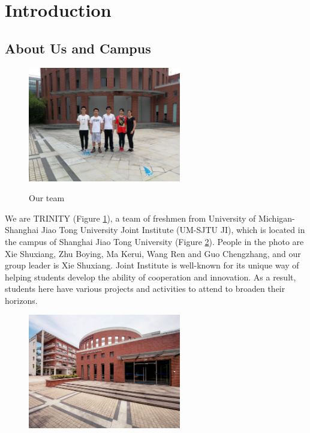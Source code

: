 \section{Introduction}

\subsection{About Us and Campus}

\begin{figure}[htbp]
\centering
\includegraphics[height=5cm]{figure/teamMember}
  \label{fig:teamMember}
  \caption{Our team}
\end{figure}

We are TRINITY (Figure \ref{fig:teamMember}), a team of freshmen from University of
Michigan-Shanghai Jiao Tong University Joint Institute (UM-SJTU JI), which is
located in the campus of Shanghai Jiao Tong University (Figure
\ref{fig:campus}). People in the photo are Xie Shuxiang, Zhu Boying, Ma Kerui,
Wang Ren and Guo Chengzhang, and our group leader is Xie Shuxiang. Joint
Institute is well-known for its unique way of helping students develop the
ability of cooperation and innovation. As a result, students here have various
projects and activities to attend to broaden their horizons.  


\begin{figure}[htbp]
\centering
\includegraphics[height=5cm]{figure/campus}
  \label{fig:campus}
  \caption{}
\end{figure}

